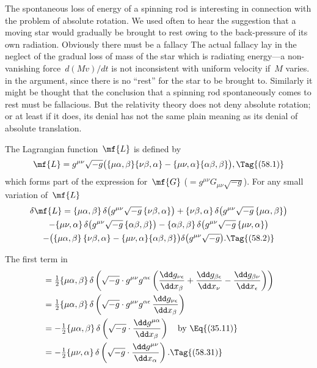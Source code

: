 \documentclass[12pt]{book}
\begin{document}
The spontaneous loss of energy of a spinning rod is interesting in connection with the problem of absolute rotation.
We used often to hear the suggestion that a moving star would gradually be brought to rest owing to the
back-pressure of its own radiation.
Obviously there must be a fallacy\footnotemark\footnotetext
     {The actual fallacy lay in the neglect of the gradual loss of mass of the star which is radiating energy---a
      non-vanishing force~$d(Mv)/dt$ is not inconsistent with uniform velocity if~$M$ varies.}
in the argument, since there is no ``rest'' for the star to be brought to.
Similarly it might be thought that the conclusion that a spinning rod spontaneously comes to rest must be fallacious.
But the relativity theory does not deny absolute rotation;
or at least if it does, its denial has not the same plain meaning as its denial of absolute translation.


The Lagrangian function~$\mf{L}$ is defined by
%
\[
\mf{L} = g^{\mu\nu} \sqrt{-g}
\bigl(\{\mu\alpha, \beta\}\{\nu\beta, \alpha\}
    - \{\mu\nu, \alpha\} \{\alpha\beta, \beta\}\bigr),
\Tag{(58.1)}
\]
which forms part of the expression for~$\mf{G}$ ($= g^{\mu\nu} G_{\mu\nu} \sqrt{-g}$). For any small
variation of~$\mf{L}$
\begin{multline*}
  \delta\mf{L}
  = \{\mu\alpha, \beta\}\, \delta\bigl(g^{\mu\nu} \sqrt{-g}\, \{\nu\beta, \alpha\}\bigr)
  + \{\nu\beta, \alpha\}\, \delta\bigl(g^{\mu\nu} \sqrt{-g}\, \{\mu\alpha, \beta\}\bigr) \\
  - \{\mu\nu, \alpha\}\, \delta\bigl(g^{\mu\nu} \sqrt{-g}\, \{\alpha\beta, \beta\}\bigr)
  - \{\alpha\beta, \beta\}\, \delta\bigl(g^{\mu\nu} \sqrt{-g}\, \{\mu\nu, \alpha\}\bigr) \\
  - \bigl(\{\mu\alpha, \beta\}\, \{\nu\beta, \alpha\} - \{\mu\nu, \alpha\}\{\alpha\beta, \beta\}\bigr)
  \delta\bigl(g^{\mu\nu} \sqrt{-g}\bigr).
  \Tag{(58.2)}
\end{multline*}

The first term in~
\begin{align*}
  &= \tfrac{1}{2} \{\mu\alpha, \beta\}\, \delta\left(\sqrt{-g} \cdot g^{\mu\nu} g^{\alpha\epsilon}
  \left(\frac{\dd g_{\nu\epsilon}}{\dd x_{\beta}}
  + \frac{\dd g_{\beta\epsilon}}{\dd x_{\nu}}
  - \frac{\dd g_{\beta\nu}}{\dd x_{\epsilon}}\right)\right) \\
  &= \tfrac{1}{2} \{\mu\alpha, \beta\}\, \delta\left(\sqrt{-g} \cdot g^{\mu\nu} g^{\alpha\epsilon}\, \frac{\dd g_{\nu\epsilon}}{\dd x_{\beta}}\right) \\
  &= -\tfrac{1}{2} \{\mu\alpha, \beta\}\, \delta\left(\sqrt{-g} \cdot \frac{\dd g^{\mu\alpha}}{\dd x_{\beta}}\right)
  \quad\text{by \Eq{(35.11)}} \\
  &= -\tfrac{1}{2} \{\mu\nu, \alpha\}\, \delta\left(\sqrt{-g} \cdot \frac{\dd g^{\mu\nu}}{\dd x_{\alpha}}\right).
  \Tag{(58.31)}
\end{align*}
\end{document}
